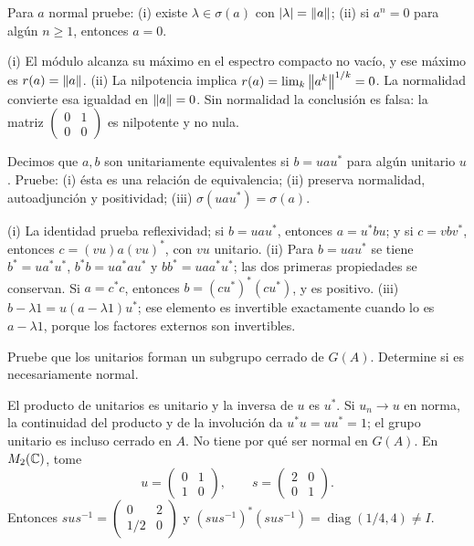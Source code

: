 \begin{ejercicio}\label{ej:v3-l25-2}
Para $a$ normal pruebe: (i) existe $\lambda\in\sigma(a)$ con $|\lambda|=\left\lVert a\right\rVert$; (ii) si $a^n=0$ para algún $n\ge1$, entonces $a=0$.
\end{ejercicio}
\begin{solucion}
(i) El módulo alcanza su máximo en el espectro compacto no vacío, y ese máximo es $r(a)=\left\lVert a\right\rVert$. (ii) La nilpotencia implica $r(a)=\lim_k\left\lVert a^k\right\rVert^{1/k}=0$. La normalidad convierte esa igualdad en $\left\lVert a\right\rVert=0$. Sin normalidad la conclusión es falsa: la matriz $\left(\begin{smallmatrix}0&1\\0&0\end{smallmatrix}\right)$ es nilpotente y no nula.
\end{solucion}

\begin{ejercicio}\label{ej:v3-l25-3}
Decimos que $a,b$ son unitariamente equivalentes si $b=uau^*$ para algún unitario $u$. Pruebe: (i) ésta es una relación de equivalencia; (ii) preserva normalidad, autoadjunción y positividad; (iii) $\sigma(uau^*)=\sigma(a)$.
\end{ejercicio}
\begin{solucion}
(i) La identidad prueba reflexividad; si $b=uau^*$, entonces $a=u^*bu$; y si $c=vbv^*$, entonces $c=(vu)a(vu)^*$, con $vu$ unitario. (ii) Para $b=uau^*$ se tiene $b^*=ua^*u^*$, $b^*b=ua^*au^*$ y $bb^*=uaa^*u^*$; las dos primeras propiedades se conservan. Si $a=c^*c$, entonces $b=(cu^*)^*(cu^*)$, y es positivo. (iii) $b-\lambda1=u(a-\lambda1)u^*$; ese elemento es invertible exactamente cuando lo es $a-\lambda1$, porque los factores externos son invertibles.
\end{solucion}

\begin{ejercicio}\label{ej:v3-l25-4}
Pruebe que los unitarios forman un subgrupo cerrado de $G(A)$. Determine si es necesariamente normal.
\end{ejercicio}
\begin{solucion}
El producto de unitarios es unitario y la inversa de $u$ es $u^*$. Si $u_n\to u$ en norma, la continuidad del producto y de la involución da $u^*u=uu^*=1$; el grupo unitario es incluso cerrado en $A$. No tiene por qué ser normal en $G(A)$. En $M_2(\mathbb C)$, tome
\[
 u=\begin{pmatrix}0&1\\1&0\end{pmatrix},\qquad
 s=\begin{pmatrix}2&0\\0&1\end{pmatrix}.
\]
Entonces $sus^{-1}=\left(\begin{smallmatrix}0&2\\1/2&0\end{smallmatrix}\right)$ y $(sus^{-1})^*(sus^{-1})=\operatorname{diag}(1/4,4)\ne I$.
\end{solucion}

